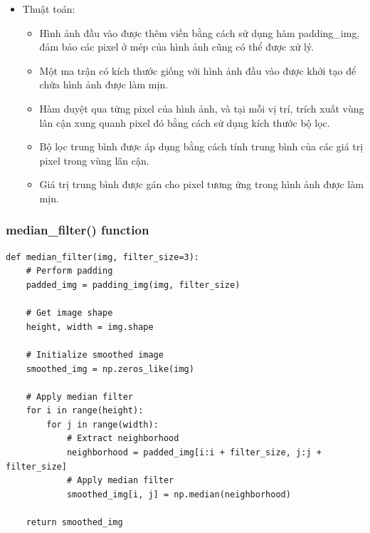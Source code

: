 \documentclass{article}
\begin{document}
\begin{itemize}
    
    \item Thuật toán:
    \begin{itemize}
        \item Hình ảnh đầu vào được thêm viền bằng cách sử dụng hàm padding\_img, đảm bảo các pixel ở mép của hình ảnh cũng có thể được xử lý.
        \item Một ma trận có kích thước giống với hình ảnh đầu vào được khởi tạo để chứa hình ảnh được làm mịn.
        \item Hàm duyệt qua từng pixel của hình ảnh, và tại mỗi vị trí, trích xuất vùng lân cận xung quanh pixel đó bằng cách sử dụng kích thước bộ lọc.

        \item Bộ lọc trung bình được áp dụng bằng cách tính trung bình của các giá trị pixel trong vùng lân cận.
        \item Giá trị trung bình được gán cho pixel tương ứng trong hình ảnh được làm mịn.
   
    \end{itemize}
\end{itemize}



\subsubsection{median\_filter() function}
\begin{lstlisting}[caption={Code of median\_filter() function}, label={median\_filter()}]
def median_filter(img, filter_size=3):
    # Perform padding
    padded_img = padding_img(img, filter_size)

    # Get image shape
    height, width = img.shape

    # Initialize smoothed image
    smoothed_img = np.zeros_like(img)

    # Apply median filter
    for i in range(height):
        for j in range(width):
            # Extract neighborhood
            neighborhood = padded_img[i:i + filter_size, j:j + filter_size]
            # Apply median filter
            smoothed_img[i, j] = np.median(neighborhood)

    return smoothed_img
\end{lstlisting}
\end{document}
